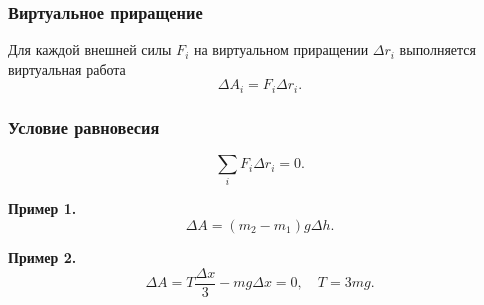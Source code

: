 \documentclass[12pt, a4paper]{article}
\begin{document}
\subsubsection*{Виртуальное приращение}
Для каждой внешней силы $F_i$ на виртуальном приращении $\Delta r_i$ выполняется виртуальная работа 
\[
\Delta A_i =  F_i\Delta r_i.
\]

\subsubsection*{Условие равновесия}
\[
\sum_i F_i\Delta r_i = 0.
\]

\textbf{Пример 1.}
\[
\Delta A = (m_2 - m_1)g\Delta h.
\]

\textbf{Пример 2.}
\[
\Delta A = T\frac{\Delta x}{3} - mg\Delta x = 0, \quad T = 3mg.
\]
\end{document}
